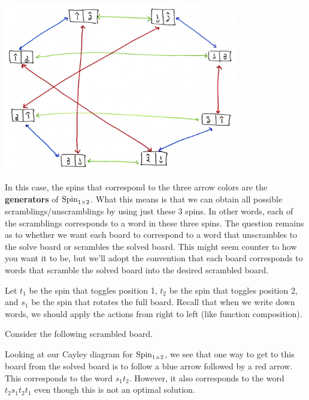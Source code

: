\begin{center}
\includegraphics[width=4in]{cayley-spin1by2.png}
\end{center}

\noindent In this case, the spins that correspond to the three arrow colors are the \textbf{generators} of \(\operatorname{Spin}_{1\times 2}\).  What this means is that we can obtain all possible scramblings/unscramblings by using just these 3 spins.  In other words, each of the scramblings corresponds to a word in these three spins.  The question remains as to whether we want each board to correspond to a word that unscrambles to the solve board or scrambles the solved board.  This might seem counter to how you want it to be, but we'll adopt the convention that each board corresponds to words that scramble the solved board into the desired scrambled board.

Let \(t_1\) be the spin that toggles position 1, \(t_2\) be the spin that toggles position 2, and \(s_1\) be the spin that rotates the full board.  Recall that when we write down words, we should apply the actions from right to left (like function composition).  

Consider the following scrambled board.

\begin{center}
\end{center}

\noindent Looking at our Cayley diagram for \(\operatorname{Spin}_{1\times 2}\), we see that one way to get to this board from the solved board is to follow a blue arrow followed by a red arrow.  This corresponds to the word \(s_1t_2\).  However, it also corresponds to the word \(t_2s_1t_2t_1\) even though this is not an optimal solution.


